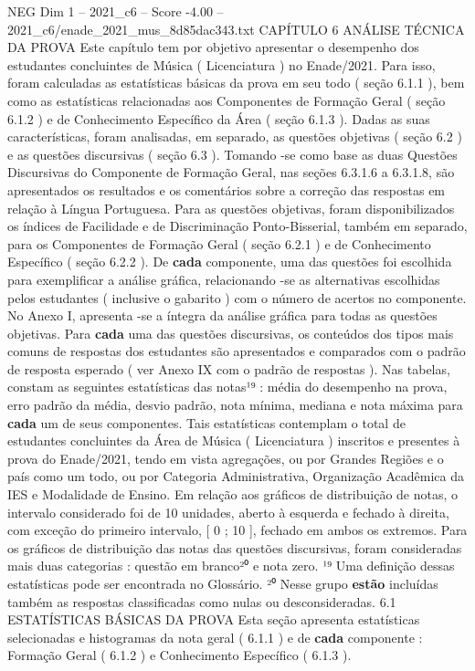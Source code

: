 \begin{textsample}{NEG Dim 1 – 2021\_c6 – Score -4.00 – 2021\_c6/enade\_2021\_mus\_8d85dac343.txt}  \label{ex:f1_neg_235}
CAPÍTULO 6 ANÁLISE TÉCNICA DA PROVA Este capítulo tem por objetivo apresentar o desempenho dos estudantes concluintes de Música ( Licenciatura ) no Enade/2021.
Para isso, foram calculadas as estatísticas básicas da prova em seu todo ( seção 6.1.1 ), bem como as estatísticas relacionadas aos Componentes de Formação Geral ( seção 6.1.2 ) e de Conhecimento Específico da Área ( seção 6.1.3 ).
Dadas as suas características, foram analisadas, em separado, as questões objetivas ( seção 6.2 ) e as questões discursivas ( seção 6.3 ).
Tomando -se como base as duas Questões Discursivas do Componente de Formação Geral, nas seções 6.3.1.6 a 6.3.1.8, são apresentados os resultados e os comentários sobre a correção das respostas em relação à Língua Portuguesa.
Para as questões objetivas, foram disponibilizados os índices de Facilidade e de Discriminação Ponto-Bisserial, também em separado, para os Componentes de Formação Geral ( seção 6.2.1 ) e de Conhecimento Específico ( seção 6.2.2 ).
De \textbf{cada} componente, uma das questões foi escolhida para exemplificar a análise gráfica, relacionando -se as alternativas escolhidas pelos estudantes ( inclusive o gabarito ) com o número de acertos no componente.
No Anexo I, apresenta -se a íntegra da análise gráfica para todas as questões objetivas.
Para \textbf{cada} uma das questões discursivas, os conteúdos dos tipos mais comuns de respostas dos estudantes são apresentados e comparados com o padrão de resposta esperado ( ver Anexo IX com o padrão de respostas ).
Nas tabelas, constam as seguintes estatísticas das notas¹⁹ : média do desempenho na prova, erro padrão da média, desvio padrão, nota mínima, mediana e nota máxima para \textbf{cada} um de seus componentes.
Tais estatísticas contemplam o total de estudantes concluintes da Área de Música ( Licenciatura ) inscritos e presentes à prova do Enade/2021, tendo em vista agregações, ou por Grandes Regiões e o país como um todo, ou por Categoria Administrativa, Organização Acadêmica da IES e Modalidade de Ensino.
Em relação aos gráficos de distribuição de notas, o intervalo considerado foi de 10 unidades, aberto à esquerda e fechado à direita, com exceção do primeiro intervalo, [ 0 ; 10 ], fechado em ambos os extremos.
Para os gráficos de distribuição das notas das questões discursivas, foram consideradas mais duas categorias : questão em branco²⁰ e nota zero. ¹⁹ Uma definição dessas estatísticas pode ser encontrada no Glossário. ²⁰ Nesse grupo \textbf{estão} incluídas também as respostas classificadas como nulas ou desconsideradas. 6.1 ESTATÍSTICAS BÁSICAS DA PROVA Esta seção apresenta estatísticas selecionadas e histogramas da nota geral ( 6.1.1 ) e de \textbf{cada} componente : Formação Geral ( 6.1.2 ) e Conhecimento Específico ( 6.1.3 ).

\end{textsample}
